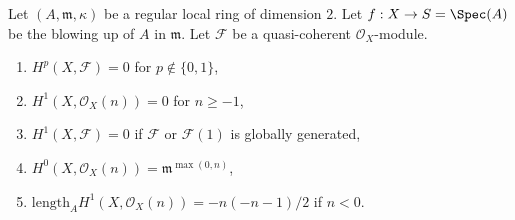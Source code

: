 %
\begin{lemma}
\label{lemma-cohomology-of-blowup}
Let $(A, \mathfrak m, \kappa)$ be a regular local ring of dimension $2$.
Let $f : X \to S = \Spec(A)$ be the blowing up of $A$ in $\mathfrak m$.
Let $\mathcal{F}$ be a quasi-coherent $\mathcal{O}_X$-module.
\begin{enumerate}
\item $H^p(X, \mathcal{F}) = 0$ for $p \not \in \{0, 1\}$,
\item $H^1(X, \mathcal{O}_X(n)) = 0$ for $n \geq -1$,
\item $H^1(X, \mathcal{F}) = 0$ if $\mathcal{F}$ or $\mathcal{F}(1)$
is globally generated,
\item $H^0(X, \mathcal{O}_X(n)) = \mathfrak m^{\max(0, n)}$,
\item $\text{length}_A H^1(X, \mathcal{O}_X(n)) = -n(-n - 1)/2$
if $n < 0$.
\end{enumerate}
\end{lemma}

